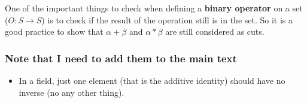 One of the important things to check when defining a \textbf{binary operator} on a set ($O: S \rightarrow S$) is to check if the result of the operation still is in the set. So it is a good practice to show that $\alpha + \beta$ and $\alpha * \beta$ are still considered as cuts. 


\subsubsection{Note that I need to add them to the main text}
\begin{itemize}
	\item In a field, just one element (that is the additive identity) should have no inverse (no any other thing).
\end{itemize}